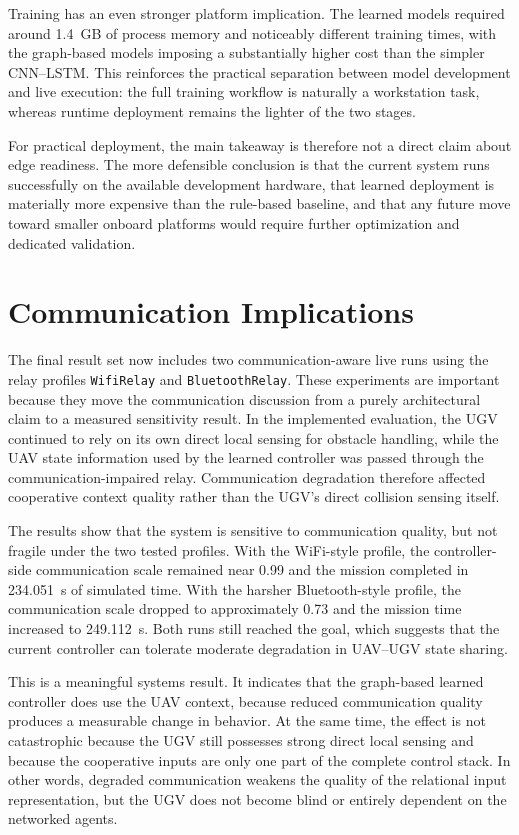 Training has an even stronger platform implication. The learned models required around 1.4~GB of process memory and noticeably different training times, with the graph-based models imposing a substantially higher cost than the simpler CNN--LSTM. This reinforces the practical separation between model development and live execution: the full training workflow is naturally a workstation task, whereas runtime deployment remains the lighter of the two stages.

For practical deployment, the main takeaway is therefore not a direct claim about edge readiness. The more defensible conclusion is that the current system runs successfully on the available development hardware, that learned deployment is materially more expensive than the rule-based baseline, and that any future move toward smaller onboard platforms would require further optimization and dedicated validation.

\section{Communication Implications}

The final result set now includes two communication-aware live runs using the relay profiles \texttt{WifiRelay} and \texttt{BluetoothRelay}. These experiments are important because they move the communication discussion from a purely architectural claim to a measured sensitivity result. In the implemented evaluation, the UGV continued to rely on its own direct local sensing for obstacle handling, while the UAV state information used by the learned controller was passed through the communication-impaired relay. Communication degradation therefore affected cooperative context quality rather than the UGV's direct collision sensing itself.

The results show that the system is sensitive to communication quality, but not fragile under the two tested profiles. With the WiFi-style profile, the controller-side communication scale remained near 0.99 and the mission completed in 234.051~s of simulated time. With the harsher Bluetooth-style profile, the communication scale dropped to approximately 0.73 and the mission time increased to 249.112~s. Both runs still reached the goal, which suggests that the current controller can tolerate moderate degradation in UAV--UGV state sharing.

This is a meaningful systems result. It indicates that the graph-based learned controller does use the UAV context, because reduced communication quality produces a measurable change in behavior. At the same time, the effect is not catastrophic because the UGV still possesses strong direct local sensing and because the cooperative inputs are only one part of the complete control stack. In other words, degraded communication weakens the quality of the relational input representation, but the UGV does not become blind or entirely dependent on the networked agents.

